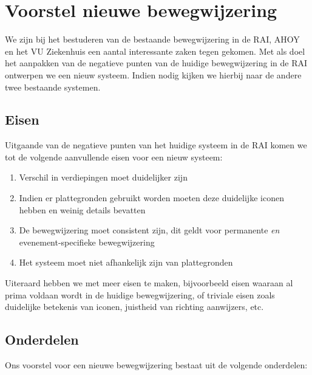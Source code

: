 \chapter{Voorstel nieuwe bewegwijzering}

We zijn bij het bestuderen van de bestaande bewegwijzering in de RAI, AHOY en het VU Ziekenhuis een aantal interessante zaken tegen gekomen. Met als doel het aanpakken van de negatieve punten van de huidige bewegwijzering in de RAI ontwerpen we een nieuw systeem. Indien nodig kijken we hierbij naar de andere twee bestaande systemen.


\section{Eisen}

Uitgaande van de negatieve punten van het huidige systeem in de RAI komen we tot de volgende aanvullende eisen voor een nieuw systeem:

\begin{enumerate}
\item Verschil in verdiepingen moet duidelijker zijn \label{eis:verdiepingen}
\item Indien er plattegronden gebruikt worden moeten deze duidelijke iconen hebben en weinig details bevatten \label{eis:plattegronden}
\item De bewegwijzering moet consistent zijn, dit geldt voor permanente \emph{en} evenement-specifieke bewegwijzering \label{eis:consistentie}
\item Het systeem moet niet afhankelijk zijn van plattegronden \label{eis:afhankelijkheid}
\end{enumerate}

Uiteraard hebben we met meer eisen te maken, bijvoorbeeld eisen waaraan al prima voldaan wordt in de huidige bewegwijzering, of triviale eisen zoals duidelijke betekenis van iconen, juistheid van richting aanwijzers, etc.


\section{Onderdelen}

Ons voorstel voor een nieuwe bewegwijzering bestaat uit de volgende onderdelen:

